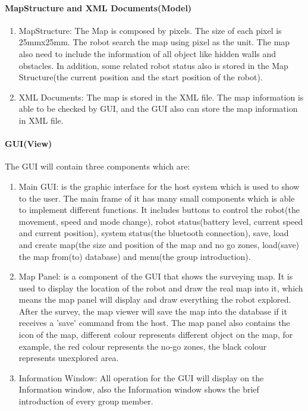 \documentclass[11pt, a4paper]{report}
\begin{document}
\paragraph{MapStructure and XML Documents(Model)} 
\begin{enumerate}
\item MapStructure: The Map is composed by pixels. The size of each pixel is 25mmx25mm. The robot search the map using pixel as the unit. The map also need to include the information of all object like hidden walls and obstacles. In addition, some related robot status also is stored in the Map Structure(the current position and the start position of the robot).
\item XML Documents: The map is stored in the XML file. The map information is able to be checked by GUI, and the GUI also can store the map information in XML file.
\end{enumerate}
\paragraph{GUI(View)} The GUI will contain three components which are:
\begin{enumerate}
\item Main GUI: is the graphic interface for the host system which is used to show to the user. The main frame of it has many small components which is able to implement different functions. It includes buttons to control the robot(the movement, speed and mode change), robot status(battery level, current
speed and current position), system status(the bluetooth connection), save, load and create
map(the size and position of the map and no go zones, load(save) the map from(to) database)
and menu(the group introduction). 
\item Map Panel: is a component of the GUI that shows the surveying map. It is used to display
the location of the robot and draw the real map into it, which means the map panel will display
and draw everything the robot explored. After the survey, the map viewer will save the map
into the database if it receives a 'save' command from the host. The map panel also contains
the icon of the map, different colour represents different object on the map, for example, the
red colour represents the no-go zones, the black colour represents unexplored area.
\item Information Window: All operation for the GUI will display on the Information window,
also the Information window shows the brief introduction of every group member.
\end{enumerate}
\end{document}
